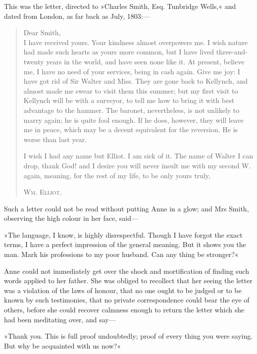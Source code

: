 This was the letter, directed to »Charles Smith, Esq. Tunbridge Wells,« and dated from London, as far back as July, 1803:—

\begin{quotation}
	
\noindent Dear Smith,\\

I have received yours. Your kindness almost overpowers me. I wish nature had made such hearts as yours more common, but I have lived three-and-twenty years in the world, and have seen none like it. At present, believe me, I have no need of your services, being in cash again. Give me joy: I have got rid of Sir Walter and Miss. They are gone back to Kellynch, and almost made me swear to visit them this summer; but my first visit to Kellynch will be with a surveyor, to tell me how to bring it with best advantage to the hammer. The baronet, nevertheless, is not unlikely to marry again; he is quite fool enough. If he does, however, they will leave me in peace, which may be a decent equivalent for the reversion. He is worse than last year.

I wish I had any name but Elliot. I am sick of it. The name of Walter I can drop, thank God! and I desire you will never insult me with my second W. again, meaning, for the rest of my life, to be only yours truly,

\begin{flushright}
\textsc{Wm. Elliot.}
\end{flushright}
\end{quotation}

Such a letter could not be read without putting Anne in a glow; and Mrs Smith, observing the high colour in her face, said—

»The language, I know, is highly disrespectful. Though I have forgot the exact terms, I have a perfect impression of the general meaning. But it shows you the man. Mark his professions to my poor husband. Can any thing be stronger?«

Anne could not immediately get over the shock and mortification of finding such words applied to her father. She was obliged to recollect that her seeing the letter was a violation of the laws of honour, that no one ought to be judged or to be known by such testimonies, that no private correspondence could bear the eye of others, before she could recover calmness enough to return the letter which she had been meditating over, and say—

»Thank you. This is full proof undoubtedly; proof of every thing you were saying. But why be acquainted with us now?«

